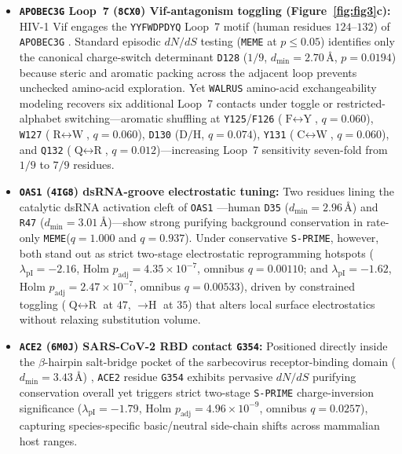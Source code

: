 \documentclass[11pt,letterpaper]{article}
\newcommand{\WALRUS}{\texttt{WALRUS}\xspace}
\newcommand{\MEME}{\texttt{MEME}\xspace}
\newcommand{\SPRIME}{\texttt{S-PRIME}\xspace}
\begin{document}
\begin{itemize}
    \item \textbf{\texttt{APOBEC3G} Loop~7 (\texttt{8CX0}) Vif-antagonism toggling (\textbf{Figure~\ref{fig:fig3}c}):} HIV-1 Vif engages the \texttt{YYFWDPDYQ} Loop~7 motif (human residues $124$--$132$) of \texttt{APOBEC3G} \citep{li2023a3g,guo2014vif}. Standard episodic $dN/dS$ testing (\MEME at $p \le 0.05$) identifies only the canonical charge-switch determinant \texttt{D128} ($1/9$, $d_{\min} = 2.70$\,\AA, $p = 0.0194$) because steric and aromatic packing across the adjacent loop prevents unchecked amino-acid exploration. Yet \WALRUS amino-acid exchangeability modeling recovers six additional Loop~7 contacts under toggle or restricted-alphabet switching---aromatic shuffling at \texttt{Y125}/\texttt{F126} ($\text{F}\leftrightarrow\text{Y}$, $q = 0.060$), \texttt{W127} ($\text{R}\leftrightarrow\text{W}$, $q = 0.060$), \texttt{D130} ($\text{D}/\text{H}$, $q = 0.074$), \texttt{Y131} ($\text{C}\leftrightarrow\text{W}$, $q = 0.060$), and \texttt{Q132} ($\text{Q}\leftrightarrow\text{R}$, $q = 0.012$)---increasing Loop~7 sensitivity seven-fold from $1/9$ to $7/9$ residues.
    \item \textbf{\texttt{OAS1} (\texttt{4IG8}) dsRNA-groove electrostatic tuning:} Two residues lining the catalytic dsRNA activation cleft of \texttt{OAS1} \citep{donovan2013oas1}---human \texttt{D35} ($d_{\min} = 2.96$\,\AA) and \texttt{R47} ($d_{\min} = 3.01$\,\AA)---show strong purifying background conservation in rate-only \MEME ($q = 1.000$ and $q = 0.937$). Under conservative \SPRIME, however, both stand out as strict two-stage electrostatic reprogramming hotspots ($\lambda_{\text{pI}} = -2.16$, Holm $p_{\text{adj}} = 4.35 \times 10^{-7}$, omnibus $q = 0.00110$; and $\lambda_{\text{pI}} = -1.62$, Holm $p_{\text{adj}} = 2.47 \times 10^{-7}$, omnibus $q = 0.00533$), driven by constrained toggling ($\text{Q}\leftrightarrow\text{R}$ at $47$, $\to\text{H}$ at $35$) that alters local surface electrostatics without relaxing substitution volume.
    \item \textbf{\texttt{ACE2} (\texttt{6M0J}) SARS-CoV-2 RBD contact \texttt{G354}:} Positioned directly inside the $\beta$-hairpin salt-bridge pocket of the sarbecovirus receptor-binding domain ($d_{\min} = 3.43$\,\AA) \citep{lan2020structure,chan2020engineering}, \texttt{ACE2} residue \texttt{G354} exhibits pervasive $dN/dS$ purifying conservation overall yet triggers strict two-stage \SPRIME charge-inversion significance ($\lambda_{\text{pI}} = -1.79$, Holm $p_{\text{adj}} = 4.96 \times 10^{-9}$, omnibus $q = 0.0257$), capturing species-specific basic/neutral side-chain shifts across mammalian host ranges.
\end{itemize}
\end{document}
